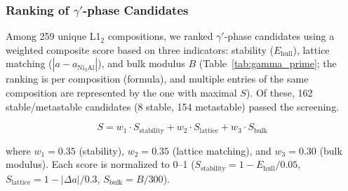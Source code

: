 \subsubsection{Ranking of $\gamma'$-phase Candidates}
\label{sec:gamma_prime}

Among 259 unique L1$_2$ compositions, we ranked $\gamma'$-phase candidates using a weighted composite score based on three indicators: stability ($E_\text{hull}$), lattice matching ($|a - a_{\text{Ni}_3\text{Al}}|$), and bulk modulus $B$ (Table~\ref{tab:gamma_prime}; the ranking is per composition (formula), and multiple entries of the same composition are represented by the one with maximal $S$). Of these, 162 stable/metastable candidates (8 stable, 154 metastable) passed the screening.

\begin{equation}
  S = w_1 \cdot S_\text{stability} + w_2 \cdot S_\text{lattice} + w_3 \cdot S_\text{bulk}
  \label{eq:composite_score}
\end{equation}

where $w_1 = 0.35$ (stability), $w_2 = 0.35$ (lattice matching), and $w_3 = 0.30$ (bulk modulus). Each score is normalized to 0--1 ($S_\text{stability} = 1 - E_\text{hull}/0.05$, $S_\text{lattice} = 1 - |\Delta a|/0.3$, $S_\text{bulk} = B/300$).

